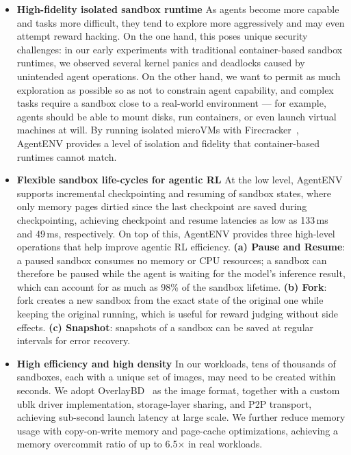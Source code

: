 \begin{itemize}[leftmargin=12pt]

    \item \textbf{High-fidelity isolated sandbox runtime} As agents become more capable and tasks more difficult, they tend to explore more aggressively and may even attempt reward hacking.
          On the one hand, this poses unique security challenges: in our early experiments with traditional container-based sandbox runtimes, we observed several kernel panics and deadlocks caused by unintended agent operations.
          On the other hand, we want to permit as much exploration as possible so as not to constrain agent capability, and complex tasks require a sandbox close to a real-world environment --- for example, agents should be able to mount disks, run containers, or even launch virtual machines at will.
          By running isolated microVMs with Firecracker~\citep{agache2020firecracker}, AgentENV provides a level of isolation and fidelity that container-based runtimes cannot match.

    \item \textbf{Flexible sandbox life-cycles for agentic RL} At the low level, AgentENV supports incremental checkpointing and resuming of sandbox states, where only memory pages dirtied since the last checkpoint are saved during checkpointing, achieving checkpoint and resume latencies as low as 133\,ms and 49\,ms, respectively.
          On top of this, AgentENV provides three high-level operations that help improve agentic RL efficiency.
          \textbf{(a) Pause and Resume}: a paused sandbox consumes no memory or CPU resources; a sandbox can therefore be paused while the agent is waiting for the model's inference result, which can account for as much as 98\% of the sandbox lifetime.
          \textbf{(b) Fork}: fork creates a new sandbox from the exact state of the original one while keeping the original running, which is useful for reward judging without side effects.
          \textbf{(c) Snapshot}: snapshots of a sandbox can be saved at regular intervals for error recovery.

    \item \textbf{High efficiency and high density} In our workloads, tens of thousands of sandboxes, each with a unique set of images, may need to be created within seconds.
          We adopt OverlayBD~\citep{li2020dadi} as the image format, together with a custom ublk driver implementation, storage-layer sharing, and P2P transport, achieving sub-second launch latency at large scale.
          We further reduce memory usage with copy-on-write memory and page-cache optimizations, achieving a memory overcommit ratio of up to 6.5$\times$ in real workloads.

\end{itemize}

